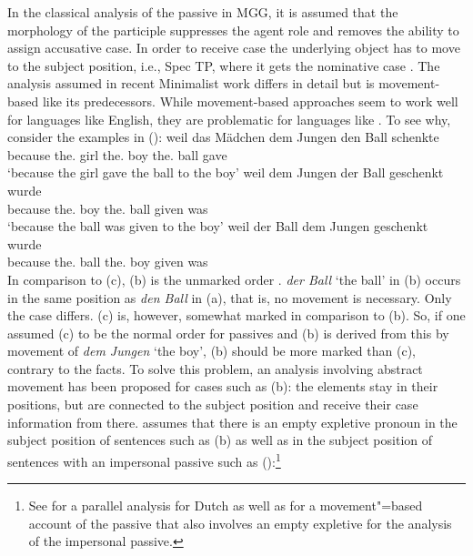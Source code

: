 \documentclass[output=paper
	        ,collection
	        ,collectionchapter
 	        ,biblatex
                ,babelshorthands
                ,newtxmath
                ,draftmode
                ,colorlinks, citecolor=brown
]{langscibook}
\begin{document}
In the classical analysis of the passive in MGG, it is assumed that the morphology of the participle suppresses
the agent role and removes the ability to assign accusative case. In order to receive case the
underlying object has to move to the subject position, i.e., Spec TP, where it gets the nominative case \citep[]{Chomsky81a}.
\eal
{}
\zl
The analysis assumed in recent Minimalist work differs in detail but is movement-based like its
predecessors. While movement-based approaches seem to work well for  languages like English, they
are problematic for  languages like . To see why, consider the examples in ():
\eal
\label{ex-passive-German-no-movement}
\ex 
\gll weil das Mädchen dem Jungen den Ball schenkte\\
     because the.\nom{} girl the.\dat{} boy the.\acc{} ball gave\\
\glt `because the girl gave the ball to the boy'
\ex 
\gll weil dem Jungen der Ball geschenkt wurde\\
	 because the.\dat{} boy the.\nom{} ball given was\\
\glt `because the ball was given to the boy'
\ex 
\gll weil der Ball dem Jungen geschenkt wurde\\
     because the.\nom{} ball the.\dat{} boy given was\\
\zl
In comparison to (c), (b) is the unmarked order \citep{Hoehle82a}. \emph{der Ball} `the ball' in (b) occurs
in the same position as \emph{den Ball} in (a), that is, no movement is necessary. Only the case differs.
(c) is, however, somewhat marked in comparison to (b). So, if one assumed (c) to
be the normal order for passives and (b) is derived from this by movement of \emph{dem
  Jungen} `the boy', (b) should be more marked than (c), contrary to the facts. To
solve this problem, an analysis involving abstract movement has been proposed for
cases such as (b): the elements stay in their positions, but are connected to
the subject position and receive their case information from there. \citet[]{Grewendorf93}
assumes that there is an empty expletive pronoun
in the subject position of sentences such as (b) as well as in the subject position of sentences with an
impersonal passive such as ():\footnote{%
	See  for a parallel analysis for Dutch as well as 
	 for a movement"=based account of the passive that also involves an
        empty expletive for the analysis of the impersonal passive.
}
\end{document}
